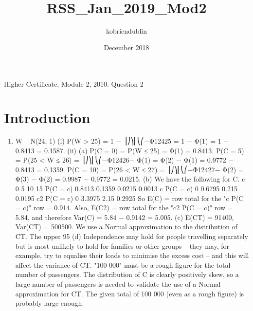 \documentclass{article}
\title{RSS_Jan_2019_Mod2}
\author{kobriendublin }
\date{December 2018}
\begin{document}
Higher Certificate, Module 2, 2010. Question 2

\section{Introduction}

\begin{enumerate}
    \item 
W ~ N(24, 1)
(i) P(W > 25) = 1 − ⎟⎠⎞⎜⎝⎛−Φ12425 = 1 − Φ(1) = 1 − 0.8413 = 0.1587.
(ii) (a) P(C = 0) = P(W ≤ 25) = Φ(1) = 0.8413.
P(C = 5) = P(25 < W ≤ 26)
= ⎟⎠⎞⎜⎝⎛−Φ12426− Φ(1) = Φ(2) − Φ(1) = 0.9772 − 0.8413 = 0.1359.
P(C = 10) = P(26 < W ≤ 27)
= ⎟⎠⎞⎜⎝⎛−Φ12427− Φ(2) = Φ(3) − Φ(2) = 0.9987 − 0.9772 = 0.0215.
(b) We have the following for C.
c
0
5
10
15
P(C = c)
0.8413
0.1359
0.0215
0.0013
c P(C = c)
0
0.6795
0.215
0.0195
c2 P(C = c)
0
3.3975
2.15
0.2925
So E(C) = row total for the "c P(C = c)" row = 0.914.
Also, E(C2) = row total for the "c2 P(C = c)" row = 5.84,
and therefore Var(C) = 5.84 − 0.9142 = 5.005.
(c) E(CT) = 91400, Var(CT) = 500500.
We use a Normal approximation to the distribution of CT.
The upper 95%
(d) Independence may hold for people travelling separately but is most unlikely to hold for families or other groups – they may, for example, try to equalise their loads to minimise the excess cost – and this will affect the variance of CT.
"100 000" must be a rough figure for the total number of passengers.
The distribution of C is clearly positively skew, so a large number of passengers is needed to validate the use of a Normal approximation for CT. The given total of 100 000 (even as a rough figure) is probably large enough.

\end{enumerate}
\end{document}
